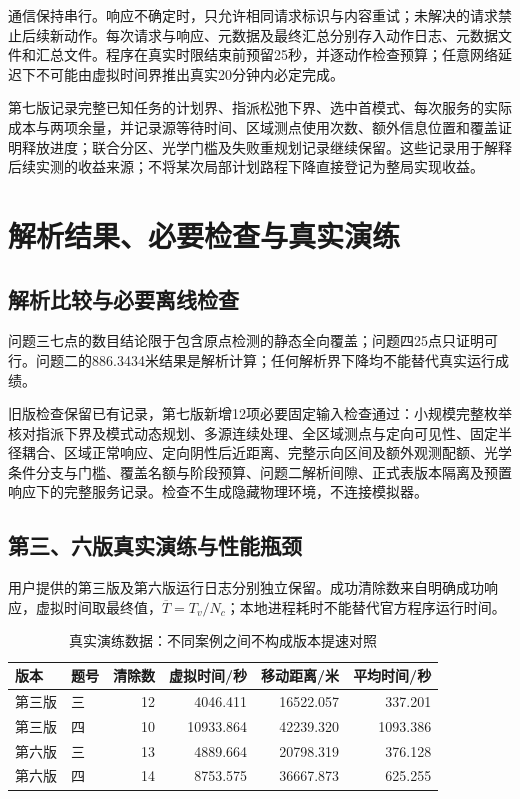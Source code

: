 \documentclass[UTF8,a4paper,zihao=-4,fontset=windows]{ctexart}
\begin{document}
通信保持串行。响应不确定时，只允许相同请求标识与内容重试；未解决的请求禁止后续新动作。每次请求与响应、元数据及最终汇总分别存入动作日志、元数据文件和汇总文件。程序在真实时限结束前预留25秒，并逐动作检查预算；任意网络延迟下不可能由虚拟时间界推出真实20分钟内必定完成。

第七版记录完整已知任务的计划界、指派松弛下界、选中首模式、每次服务的实际成本与两项余量，并记录源等待时间、区域测点使用次数、额外信息位置和覆盖证明释放进度；联合分区、光学门槛及失败重规划记录继续保留。这些记录用于解释后续实测的收益来源；不将某次局部计划路程下降直接登记为整局实现收益。

\section{解析结果、必要检查与真实演练}
\subsection{解析比较与必要离线检查}
问题三七点的数目结论限于包含原点检测的静态全向覆盖；问题四25点只证明可行。问题二的886.3434米结果是解析计算；任何解析界下降均不能替代真实运行成绩。

旧版检查保留已有记录，第七版新增12项必要固定输入检查通过：小规模完整枚举核对指派下界及模式动态规划、多源连续处理、全区域测点与定向可见性、固定半径耦合、区域正常响应、定向阴性后近距离、完整示向区间及额外观测配额、光学条件分支与门槛、覆盖名额与阶段预算、问题二解析间隙、正式表版本隔离及预置响应下的完整服务记录。检查不生成隐藏物理环境，不连接模拟器。

\subsection{第三、六版真实演练与性能瓶颈}
用户提供的第三版及第六版运行日志分别独立保留。成功清除数来自明确成功响应，虚拟时间取最终值，$\overline T=T_v/N_c$；本地进程耗时不能替代官方程序运行时间。
\begin{table}[htbp]\centering\small
\caption{真实演练数据：不同案例之间不构成版本提速对照}\label{tab:practice}
\begin{tabular}{llrrrr}\toprule
版本&题号&清除数&虚拟时间/秒&移动距离/米&平均时间/秒\\\midrule
第三版&三&12&4046.411&16522.057&337.201\\
第三版&四&10&10933.864&42239.320&1093.386\\
第六版&三&13&4889.664&20798.319&376.128\\
第六版&四&14&8753.575&36667.873&625.255\\\bottomrule
\end{tabular}
\end{table}
\end{document}
